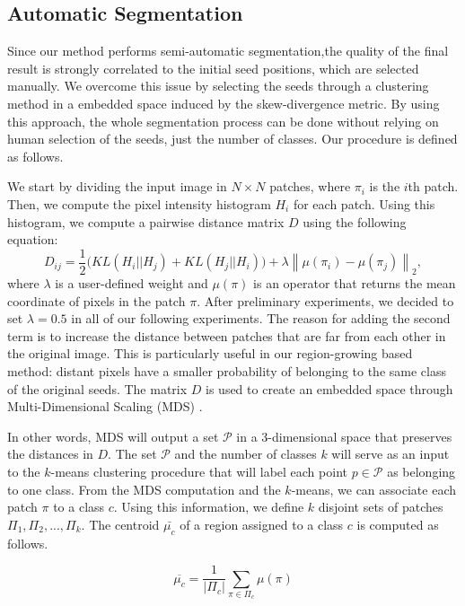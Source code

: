 \documentclass[10pt,twocolumn,letterpaper]{article}
\newcommand{\norm}[1]{\left\lVert#1\right\rVert}
\begin{document}
\subsection{Automatic Segmentation}

Since our method performs semi-automatic segmentation,the quality  of the final result is strongly correlated to the initial seed positions, which are selected manually. We overcome this issue by selecting the seeds through a clustering method in a embedded space induced by the skew-divergence metric. By using this approach, the whole segmentation process can be done without relying on human selection of the seeds, just the number of classes. Our procedure is defined as follows.

We start by dividing the input image in $N \times N$ patches, where $\pi_i$ is the $i$th patch. Then, we compute the pixel intensity histogram $H_i$ for each patch. Using this histogram, we compute a pairwise distance matrix $D$ using the following equation:
\begin{equation}
D_{ij} = \frac{1}{2} \bigg( KL(H_i || H_j) + KL(H_j || H_i) \bigg) + \lambda \norm{ \mu(\pi_i) - \mu(\pi_j) }_2 ,
\end{equation}
where $\lambda$ is a user-defined weight and $\mu(\pi)$ is an operator that returns the mean coordinate of pixels in the patch $\pi$. After preliminary experiments, we decided to set $\lambda=0.5$ in all of our following experiments. The reason for adding the second term is to increase the distance between patches that are far from each other in the original image. This is particularly useful in our region-growing based method: distant pixels have a smaller probability of belonging to the same class of the original seeds. The matrix $D$ is used to create an embedded space through Multi-Dimensional Scaling (MDS) \cite{BORG05a}. 

In other words, MDS will output a set $\mathcal{P}$ in a 3-dimensional space that preserves the distances in $D$. The set $\mathcal{P}$ and the number of classes $k$ will serve as an input to the $k$-means clustering \cite{DUDA00a} procedure that will label each point $p \in \mathcal{P}$ as belonging to one class. From the MDS computation and the $k$-means, we can associate each patch $\pi$ to a class $c$. Using this information, we define $k$ disjoint sets of patches $\Pi_1, \Pi_2, ..., \Pi_k$. The centroid $\bar{\mu_c}$ of a region assigned to a class $c$ is computed as follows.

\begin{equation}
\overline{\mu_c} = \frac{1}{|\Pi_c|}\sum_{\pi \in \Pi_c} \mu(\pi) \label{eq:muc}
\end{equation}
\end{document}
